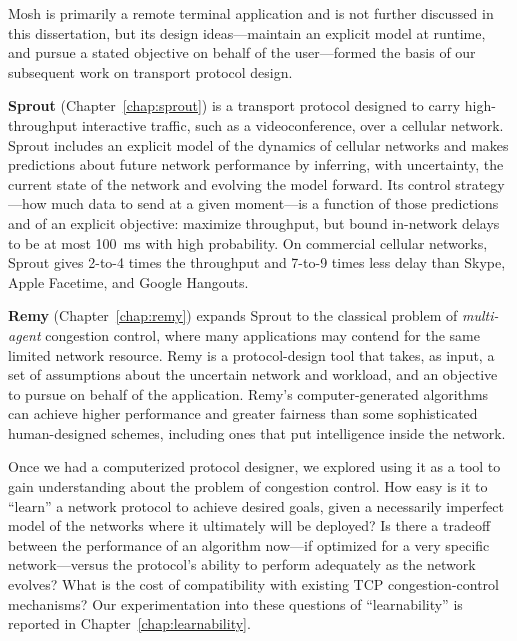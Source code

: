 Mosh is primarily a remote terminal application and is not further
discussed in this dissertation, but its design ideas---maintain an
explicit model at runtime, and pursue a stated objective on behalf
of the user---formed the basis of our subsequent work on transport
protocol design.

\textbf{Sprout} (Chapter~\ref{chap:sprout}) is a transport protocol
designed to carry high-throughput interactive traffic, such as a
videoconference, over a cellular network. Sprout includes an explicit
model of the dynamics of cellular networks and makes predictions about
future network performance by inferring, with uncertainty, the current
state of the network and evolving the model forward. Its control
strategy---how much data to send at a given moment---is a function of
those predictions and of an explicit objective: maximize throughput,
but bound in-network delays to be at most 100~ms with high
probability. On commercial cellular networks, Sprout gives 2-to-4
times the throughput and 7-to-9 times less delay than Skype, Apple
Facetime, and Google Hangouts.

\textbf{Remy} (Chapter~\ref{chap:remy}) expands Sprout to the
classical problem of \emph{multi-agent} congestion control, where many
applications may contend for the same limited network resource. Remy
is a protocol-design tool that takes, as input, a set of assumptions
about the uncertain network and workload, and an objective to pursue
on behalf of the application. Remy's computer-generated algorithms can
achieve higher performance and greater fairness than some
sophisticated human-designed schemes, including ones that put
intelligence inside the network.

Once we had a computerized protocol designer, we explored using it as
a tool to gain understanding about the problem of congestion control.
How easy is it to ``learn'' a network protocol to achieve desired
goals, given a necessarily imperfect model of the networks where it
ultimately will be deployed? Is there a tradeoff between the
performance of an algorithm now---if optimized for a very specific
network---versus the protocol's ability to perform adequately as the
network evolves? What is the cost of compatibility with existing TCP
congestion-control mechanisms? Our experimentation into these
questions of ``learnability'' is reported in
Chapter~\ref{chap:learnability}.
